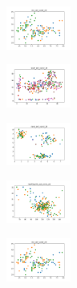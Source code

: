 \begin{figure}[H]    
    \centering
    \begin{subfigure}
        \centering
        \includegraphics[width=0.234\textwidth]{img/hs/iris_set_const_20_949004259_clust.png}
    \end{subfigure}
    \hfill
    \begin{subfigure}
        \centering
        \includegraphics[width=0.234\textwidth]{img/hs/ecoli_set_const_20_949004259_clust.png}
    \end{subfigure}
    \hfill
    \begin{subfigure}
        \centering
        \includegraphics[width=0.234\textwidth]{img/hs/rand_set_const_20_949004259_clust.png}
    \end{subfigure}
    \hfill
    \begin{subfigure}
        \centering
        \includegraphics[width=0.234\textwidth]{img/hs/newthyroid_set_const_20_949004259_clust.png}
    \end{subfigure}
    \hfill
    \begin{subfigure}
        \centering
        \includegraphics[width=0.234\textwidth]{img/hs/iris_set_const_20_589741062_clust.png}
    \end{subfigure}
    \hfill
    \begin{subfigure}

\end{subfigure}
\end{figure}
